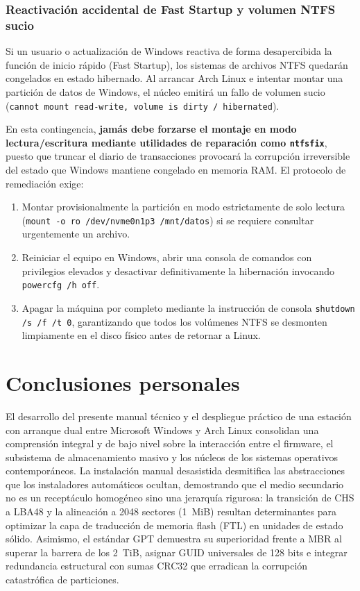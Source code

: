 \documentclass[12pt]{article}
\begin{document}
\subsubsection{Reactivación accidental de Fast Startup y volumen NTFS sucio}

Si un usuario o actualización de Windows reactiva de forma desapercibida la función de inicio rápido (Fast Startup), los sistemas de archivos NTFS quedarán congelados en estado hibernado. Al arrancar Arch Linux e intentar montar una partición de datos de Windows, el núcleo emitirá un fallo de volumen sucio (\texttt{cannot mount read-write, volume is dirty / hibernated}).

En esta contingencia, \textbf{jamás debe forzarse el montaje en modo lectura/escritura mediante utilidades de reparación como \texttt{ntfsfix}}, puesto que truncar el diario de transacciones provocará la corrupción irreversible del estado que Windows mantiene congelado en memoria RAM. El protocolo de remediación exige:
\begin{enumerate}[noitemsep, topsep=2pt]
    \item Montar provisionalmente la partición en modo estrictamente de solo lectura (\texttt{mount -o ro /dev/nvme0n1p3 /mnt/datos}) si se requiere consultar urgentemente un archivo.
    \item Reiniciar el equipo en Windows, abrir una consola de comandos con privilegios elevados y desactivar definitivamente la hibernación invocando \texttt{powercfg /h off}.
    \item Apagar la máquina por completo mediante la instrucción de consola \texttt{shutdown /s /f /t 0}, garantizando que todos los volúmenes NTFS se desmonten limpiamente en el disco físico antes de retornar a Linux.
\end{enumerate}

\section{Conclusiones personales}
\label{sec:conclusionesPersonales}

El desarrollo del presente manual técnico y el despliegue práctico de una estación con arranque dual entre Microsoft Windows y Arch Linux consolidan una comprensión integral y de bajo nivel sobre la interacción entre el firmware, el subsistema de almacenamiento masivo y los núcleos de los sistemas operativos contemporáneos. La instalación manual desasistida desmitifica las abstracciones que los instaladores automáticos ocultan, demostrando que el medio secundario no es un receptáculo homogéneo sino una jerarquía rigurosa: la transición de CHS a LBA48 y la alineación a 2048 sectores (1~MiB) resultan determinantes para optimizar la capa de traducción de memoria flash (FTL) en unidades de estado sólido. Asimismo, el estándar GPT demuestra su superioridad frente a MBR al superar la barrera de los 2~TiB, asignar GUID universales de 128 bits e integrar redundancia estructural con sumas CRC32 que erradican la corrupción catastrófica de particiones.
\end{document}
